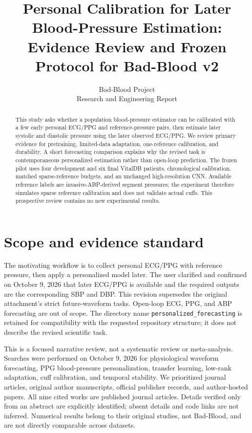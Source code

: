 \documentclass[11pt]{article}
\title{Personal Calibration for Later Blood-Pressure Estimation:\\ Evidence Review and Frozen Protocol for Bad-Blood v2}
\author{Bad-Blood Project\\Research and Engineering Report}
\date{}
\begin{document}
\maketitle
\begin{abstract}
This study asks whether a population blood-pressure estimator can be calibrated with a few early personal ECG/PPG and reference-pressure pairs, then estimate later systolic and diastolic pressure using the later observed ECG/PPG. We review primary evidence for pretraining, limited-data adaptation, one-reference calibration, and durability. A short forecasting comparison explains why the revised task is contemporaneous personalized estimation rather than open-loop prediction. The frozen pilot uses four development and six final VitalDB patients, chronological calibration, matched sparse-reference budgets, and an unchanged high-resolution CNN. Available reference labels are invasive-ABP-derived segment pressures; the experiment therefore simulates sparse reference calibration and does not validate actual cuffs. This prospective review contains no new experimental results.
\end{abstract}

\section{Scope and evidence standard}
The motivating workflow is to collect personal ECG/PPG with reference pressure, then apply a personalized model later. The user clarified and confirmed on October 9, 2026 that later ECG/PPG is available and the required outputs are the corresponding SBP and DBP. This revision supersedes the original attachment's strict future-waveform tasks. Open-loop ECG, PPG, and ABP forecasting are out of scope. The directory name \texttt{personalized\_forecasting} is retained for compatibility with the requested repository structure; it does not describe the revised scientific task.

This is a focused narrative review, not a systematic review or meta-analysis. Searches were performed on October 9, 2026 for physiological waveform forecasting, PPG blood-pressure personalization, transfer learning, low-rank adaptation, cuff calibration, and temporal stability. We prioritized journal articles, original author manuscripts, official publisher records, and author-hosted papers. All nine cited works are published journal articles. Details verified only from an abstract are explicitly identified; absent details and code links are not inferred. Numerical results belong to their original studies, not Bad-Blood, and are not directly comparable across datasets.
\end{document}
